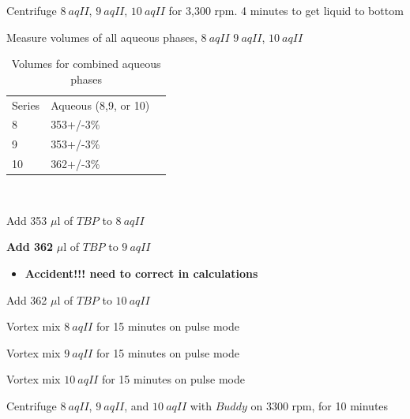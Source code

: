 \documentclass[idxtotoc,hyperref,openany,oneside]{labbook} %
\newcommand{\cmark}{\ding{51}}%
\newcommand{\done}{\rlap{$\square$}{\raisebox{2pt}{\large\hspace{1pt}\cmark}}%
  \hspace{-2.5pt}}
\begin{document}
\begin{todolist}
\item[\done]{Centrifuge $\boxed{8\ aqII}$, $\boxed{9\ aqII}$,
  $\boxed{10\ aqII}$ for 3,300 rpm. 4 minutes to get liquid to
  bottom}
\item[\done]{Measure volumes of all aqueous phases, $\boxed{8\ aqII}$
     $\boxed{9\ aqII}$, $\boxed{10\ aqII}$}
\begin{table}[H]
  \begin{center}
    \caption{Volumes for combined aqueous phases}
    \begin{tabular}{l l l}
      \toprule
      Series & Aqueous (8,9, or 10)\\ 
      8 &  353+/-3\% \\
      9 &  353+/-3\% \\
      10 & 362+/-3\% \\
      \bottomrule
    \end{tabular}
  \end{center}
\end{table}  
\
\item[\done]{Add 353 $\mu$l of $\boxed{TBP}$ to $\boxed{8\ aqII}$}
\item[\done]{\textbf{Add 362 }$\mu$l of $\boxed{TBP}$ to $\boxed{9\ aqII}$}
  \begin{itemize}
  \item{\textbf{Accident!!! need to correct in calculations}}
  \end{itemize}
\item[\done]{Add 362 $\mu$l of $\boxed{TBP}$ to $\boxed{10\ aqII}$}
\item[\done]{Vortex mix $\boxed{8\ aqII}$ for 15 minutes on pulse mode}
\item[\done]{Vortex mix $\boxed{9\ aqII}$ for 15 minutes on pulse mode}
\item[\done]{Vortex mix $\boxed{10\ aqII}$ for 15 minutes on pulse mode}

\item[\done]{Centrifuge $\boxed{8\ aqII}$, $\boxed{9\ aqII}$,
  and $\boxed{10\ aqII}$
  with $\boxed{Buddy}$ on 3300 rpm, for 10 minutes}


\end{todolist}
\end{document}
